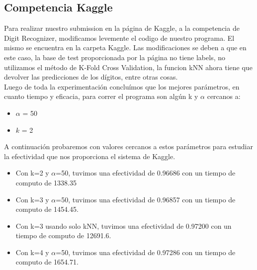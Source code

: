 \subsection{Competencia Kaggle}
Para realizar nuestro submission en la página de Kaggle, a la competencia de Digit Recognizer, modificamos levemente el codigo de nuestro programa. El mismo se encuentra en la carpeta Kaggle. Las modificaciones se deben a que en este caso, la base de test proporcionada por la página no tiene labels, no utilizamos el método de K-Fold Cross Validation, la funcion kNN ahora tiene que devolver las predicciones de los dígitos, entre otras cosas.\\
Luego de toda la experimentación concluímos que los mejores parámetros, en cuanto tiempo y eficacia, para correr el programa son algún k y $\alpha$ cercanos a:
\begin{itemize}
\item $\alpha$ = 50
\item $k$ = 2
\end{itemize}

A continuación probaremos con valores cercanos a estos parámetros para estudiar la efectividad que nos proporciona el sistema de Kaggle.
\begin{itemize}
	\item Con k=2 y $\alpha$=50, tuvimos una efectividad de 0.96686 con un tiempo de computo de 1338.35 
	\item Con k=3 y $\alpha$=50, tuvimos una efectividad de 0.96857 con un tiempo de computo de 1454.45.
	\item Con k=3 usando solo kNN, tuvimos una efectividad de 0.97200 con un tiempo de computo de 12691.6.
	\item Con k=4 y $\alpha$=50, tuvimos una efectividad de 0.97286 con un tiempo de computo de 1654.71.
\end{itemize}